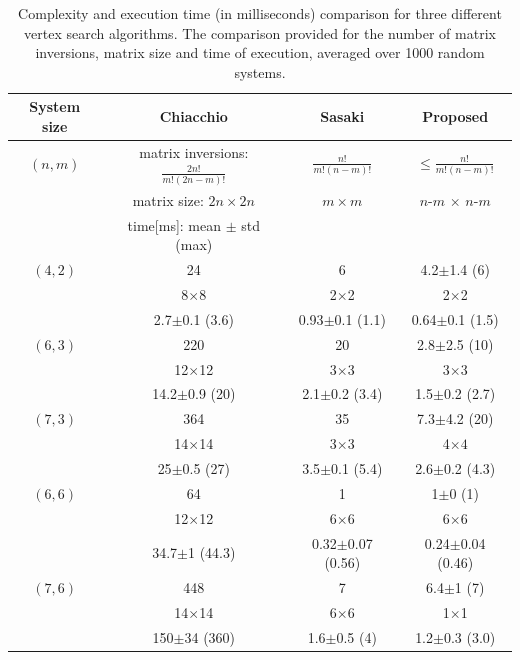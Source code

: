 \begin{table}[!h]
    \centering
    \caption{Complexity and execution time (in milliseconds) comparison for three different vertex search algorithms. The comparison provided for the number of matrix inversions, matrix size and time of execution, averaged over 1000 random systems. }
    \begin{tabular}{|c|c|c|c|}
       \hline
      \textbf{ System size }& \textbf{Chiacchio}\cite{chiacchio_evaluation_1996} & \textbf{Sasaki} \cite{sasaki_vertex_nodate}  &  \textbf{Proposed} \\
       \hline
       $(n,m)$& matrix inversions: $ \frac{2n!}{m!(2n-m)!}$  & $ \frac{n!}{m!(n-m)!} $ & $ \leq \frac{n!}{m!(n-m)!}$ \\
       &  matrix size:  $ 2n \times 2n$ & $m\times m$  & $n$-$m$ $\times$ $n$-$m$\\
       & time[ms]: mean $\pm$ std (max) & & \\
       \hline
       $(4,2)$ &  24 & 6 & 4.2$\pm$1.4 (6) \\ 
       & 8$\times$8 & 2$\times$2 & 2$\times$2 \\ 
       & 2.7$\pm$0.1 (3.6) & 0.93$\pm$0.1 (1.1) & 0.64$\pm$0.1 (1.5) \\ 
       \hline
       $(6,3)$ & 220 & 20 & 2.8$\pm$2.5 (10) \\ 
        & 12$\times$12 & 3$\times$3 & 3$\times$3 \\ 
       & 14.2$\pm$0.9 (20) & 2.1$\pm$0.2 (3.4) & 1.5$\pm$0.2 (2.7) \\ 
       \hline
      $(7,3)$&    364 & 35 & 7.3$\pm$4.2 (20)\\
        & 14$\times$14 & 3$\times$3 & 4$\times4$\\
       & 25$\pm$0.5 (27) & 3.5$\pm$0.1 (5.4) & 2.6$\pm$0.2 (4.3)\\
       \hline
      $(6,6)$&   64 & 1 & 1$\pm$0 (1)\\
        &  12$\times$12 & 6$\times$6 & 6$\times6$\\
       & 34.7$\pm$1 (44.3) & 0.32$\pm$0.07 (0.56) & 0.24$\pm$0.04 (0.46)\\
       \hline
      $(7,6)$& 448 & 7 & 6.4$\pm$1 (7)\\
        & 14$\times$14 & 6$\times$6 & 1$\times$1\\
       & 150$\pm$34 (360) & 1.6$\pm$0.5 (4) & 1.2$\pm$0.3 (3.0)\\
       \hline
    \end{tabular}
    \label{tab:complexity_results}
\end{table}


